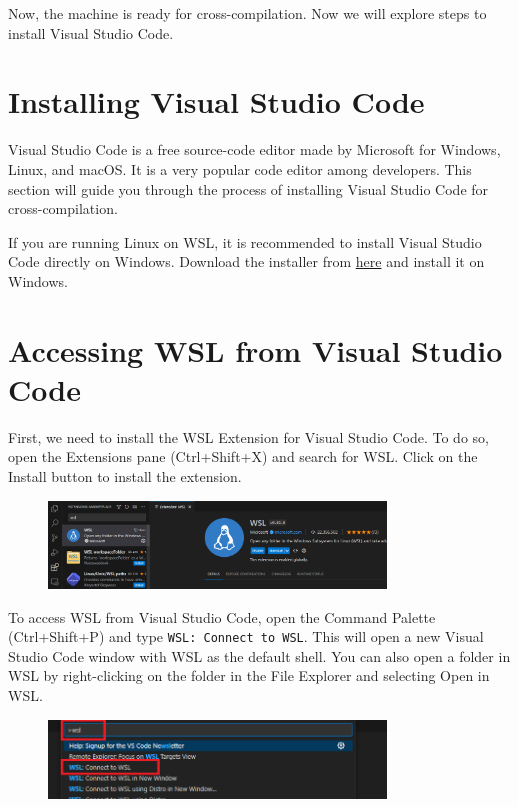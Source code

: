 Now, the machine is ready for cross-compilation. Now we will explore steps to install Visual Studio Code.

\section{Installing Visual Studio Code}

Visual Studio Code is a free source-code editor made by Microsoft for Windows, Linux, and macOS. It is a very popular code editor among developers. This section will guide you through the process of installing Visual Studio Code for cross-compilation.

If you are running Linux on WSL, it is recommended to install Visual Studio Code directly on Windows. Download the installer from \href{https://code.visualstudio.com/Download}{here} and install it on Windows.

\section{Accessing WSL from Visual Studio Code}

First, we need to install the WSL Extension for Visual Studio Code. To do so, open the Extensions pane (Ctrl+Shift+X) and search for WSL. Click on the Install button to install the extension.

\begin{figure}[H]
      \centering
      \includegraphics[width=0.8\textwidth]{texs/chapter1/image/wslext.png}
\end{figure}

To access WSL from Visual Studio Code, open the Command Palette (Ctrl+Shift+P) and type \texttt{WSL: Connect to WSL}. This will open a new Visual Studio Code window with WSL as the default shell. You can also open a folder in WSL by right-clicking on the folder in the File Explorer and selecting Open in WSL.

\begin{figure}[H]
      \centering
      \includegraphics[width=0.8\textwidth]{texs/chapter1/image/wslconnect.png}
\end{figure}

